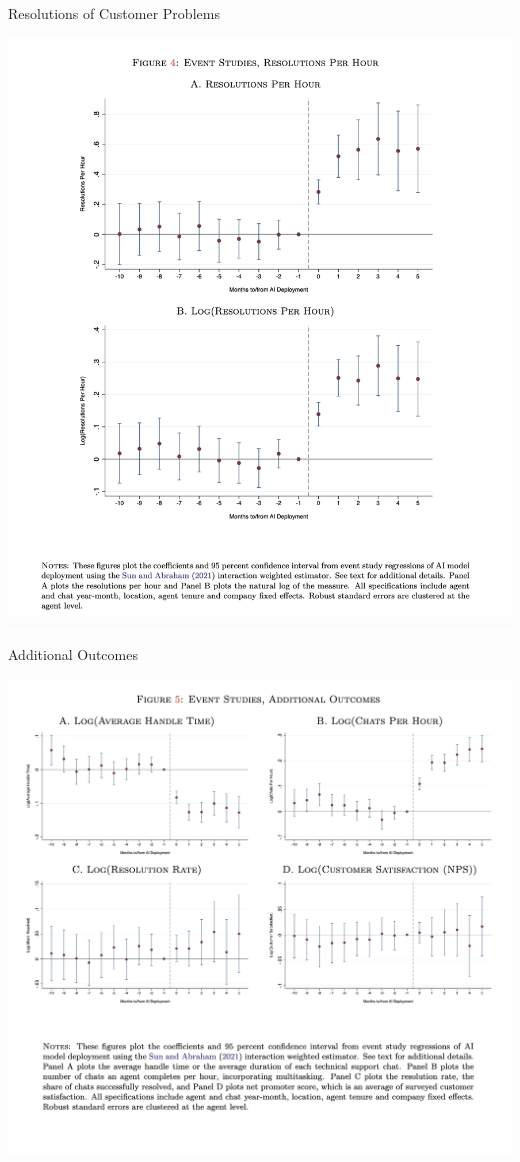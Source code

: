 \documentclass{beamer}
\begin{document}
\begin{frame}{Resolutions of Customer Problems}
\begin{center}
\includegraphics[scale=0.25]{./lecture_includes/brynn3}
\end{center}
\end{frame}


\begin{frame}{Additional Outcomes}
\begin{center}
\includegraphics[scale=0.35]{./lecture_includes/brynn4}
\end{center}
\end{frame}
\end{document}
